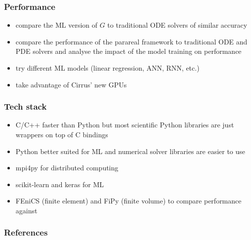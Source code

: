 \documentclass[xcolor=x11names,compress,usenames,dvipsnames,mathsans]{beamer}
\begin{document}
\begin{frame}
\frametitle{Performance}
\begin{itemize}
    \item compare the ML version of $G$ to traditional ODE solvers of similar accuracy
    \item compare the performance of the parareal framework to traditional ODE and PDE solvers and analyse the impact of the model training on performance
    \item try different ML models (linear regression, ANN, RNN, etc.)
    \item take advantage of Cirrus' new GPUs
\end{itemize} 
\end{frame}

\begin{frame}
\frametitle{Tech stack}
\begin{itemize}
    \item C/C++ faster than Python but most scientific Python libraries are just wrappers on top of C bindings
    \item Python better suited for ML and numerical solver libraries are easier to use
    \item mpi4py \cite{dalcin2005} for distributed computing
    \item scikit-learn \cite{pedregosa2011} and keras \cite{chollet2015} for ML
    \item FEniCS \cite{fenics2015} (finite element) and FiPy \cite{fipy2009} (finite volume) to compare performance against
\end{itemize}
\end{frame}


\begin{frame}[allowframebreaks]
\frametitle{References}


\end{frame}
\end{document}
